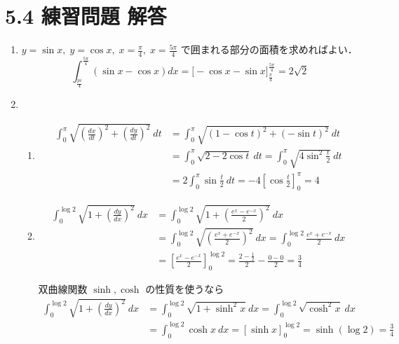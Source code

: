 \documentclass[a4paper,12pt, uplatex, dvipdfmx]{jsarticle}
\begin{document}
\section*{5.4 練習問題 解答}

\begin{enumerate}

  \setlength{\itemsep}{2zh}
  
\item $y=\sin x, \; y=\cos x, \; x=\frac{\pi}{4}, \; x=\frac{5\pi}{4}$ で囲まれる部分の面積を求めればよい．
  \[
    \int_{\frac{pi}{4}}^{\frac{5\pi}{4}} \left( \sin x - \cos x\right) dx
    = \Big[ -\cos x - \sin x\Big]_{\frac{\pi}{4}}^{\frac{5\pi}{4}}
    = 2 \sqrt{2}
  \]

\item

  \begin{enumerate}[(1)]
  \item
    \[
      \begin{aligned}
        \int_{0}^{\pi} \sqrt{ \left( \frac{dx}{dt}\right)^2 + \left(\frac{dy}{dt}\right)^2} \ dt
        &= \int_{0}^{\pi} \sqrt{\left( 1-\cos t\right)^2 + \left( -\sin t\right)^2} \ dt\\
        &= \int_{0}^{\pi} \sqrt{2-2 \cos t}\ dt = \int_{0}^{\pi}\sqrt{ 4 \sin^2 \frac{t}{2}} \ dt\\
        &= 2 \int_{0}^{\pi} \sin \frac{t}{2} \ dt =-4 \left[ \cos \frac{t}{2}\right]_{0}^{\pi} = 4
      \end{aligned}
    \]

  \item
    \[
      \begin{aligned}
        \int_{0}^{\log 2} \sqrt{1+\left( \frac{dy}{dx}\right)^2} \ dx
        &= \int_{0}^{\log 2} \sqrt{1 + \left( \frac{e^x-e^{-x}}{2} \right)^2} \ dx\\
        &  = \int_{0}^{\log 2} \sqrt{ \left( \frac{e^x+e^{-x}}{2}\right)^2} \ dx
          = \int_{0}^{\log 2} \frac{e^x+e^{-x}}{2} \ dx\\
        &= \left[ \frac{e^x - e^{-x}}{2}\right]_{0}^{\log 2} = \frac{2-\frac{1}{2}}{2} - \frac{0-0}{2} = \frac{3}{4}
      \end{aligned}
    \]

    \vspace{2zh}
    
    双曲線関数 $\sinh, \cosh$ の性質を使うなら
    \[
      \begin{aligned}
        \int_{0}^{\log 2} \sqrt{ 1+ \left( \frac{dy}{dx}\right)^2} \ dx
        &= \int_{0}^{\log 2} \sqrt{ 1+ \sinh^2 x} \ dx = \int_{0}^{\log 2} \sqrt{\cosh^2 x} \ dx\\
        &= \int_{0}^{\log 2} \cosh x \ dx = \left[ \sinh x\right]_{0}^{\log 2}
          = \sinh\left( \log 2\right) =\frac{3}{4}
      \end{aligned}
    \]
  \end{enumerate}

\end{enumerate}
\end{document}

